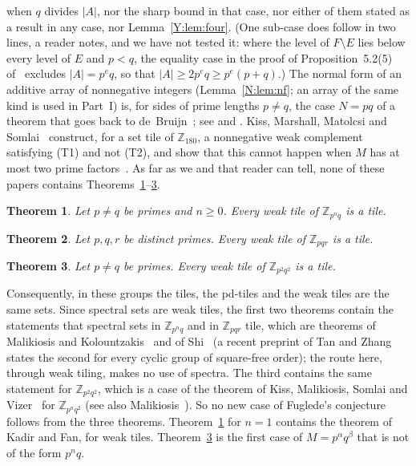 \documentclass[11pt,a4paper]{amsart}
\newtheorem{theorem}{Theorem}
\theoremstyle{definition}
\theoremstyle{remark}
\newcommand{\Z}{\mathbb{Z}}
\begin{document}
when $q$ divides $|A|$, nor the sharp bound in that case, nor either of them stated as a result in any case, nor
Lemma~\ref{Y:lem:four}. (One sub-case does follow in two lines, a reader notes, and we have not tested it: where the level of
$F\setminus E$ lies below every level of $E$ and $p<q$, the equality case in the proof of
Proposition~5.2(5) of~\cite{MK} excludes $|A|=p^eq$, so that $|A|\ge 2p^eq\ge p^e(p+q)$.) The normal form of an additive array of nonnegative integers (Lemma~\ref{N:lem:nf}; an
array of the same kind is used in Part~I) is, for sides of prime lengths $p\ne q$, the case $N=pq$ of a theorem that
goes back to de~Bruijn~\cite{Bru}; see \cite{LL} and \cite[Lemma~2.3]{KLaMS}. Kiss, Marshall, Matolcsi and Somlai~\cite{KMMS2} construct, for a set tile
of $\Z_{180}$, a nonnegative weak complement satisfying (T1) and not (T2), and show that this cannot happen when
$M$ has at most two prime factors~\cite[Proposition~6.4]{KMMS2}. As far as we and that reader can tell, none of
these papers contains Theorems~\ref{thm:A}--\ref{thm:C}.

\begin{theorem}\label{thm:A}
Let $p\ne q$ be primes and $n\ge 0$. Every weak tile of $\Z_{p^nq}$ is a tile.
\end{theorem}

\begin{theorem}\label{thm:B}
Let $p,q,r$ be distinct primes. Every weak tile of $\Z_{pqr}$ is a tile.
\end{theorem}

\begin{theorem}\label{thm:C}
Let $p\ne q$ be primes. Every weak tile of $\Z_{p^2q^2}$ is a tile.
\end{theorem}

\noindent Consequently, in these groups the tiles, the pd-tiles and the weak tiles are the same sets. Since
spectral sets are weak tiles, the first two theorems contain the statements that spectral sets in $\Z_{p^nq}$ and in
$\Z_{pqr}$ tile, which are theorems of Malikiosis and Kolountzakis~\cite{MK} and of Shi~\cite{Shi} (a recent
preprint of Tan and Zhang~\cite{TZ2} states the second for every cyclic group of square-free order); the route
here, through weak tiling, makes no use of spectra. The third contains the same statement for $\Z_{p^2q^2}$,
which is a case of the theorem of Kiss, Malikiosis, Somlai and Vizer~\cite{KMSV} for $\Z_{p^nq^2}$ (see also
Malikiosis~\cite{Mal}). So no new case of Fuglede's conjecture follows from the three theorems. Theorem~\ref{thm:A} for $n=1$ contains the theorem of Kadir and Fan, for weak tiles.
Theorem~\ref{thm:C} is the first case of $M=p^\alpha q^\beta$ that is not of the form $p^nq$.
\end{document}
